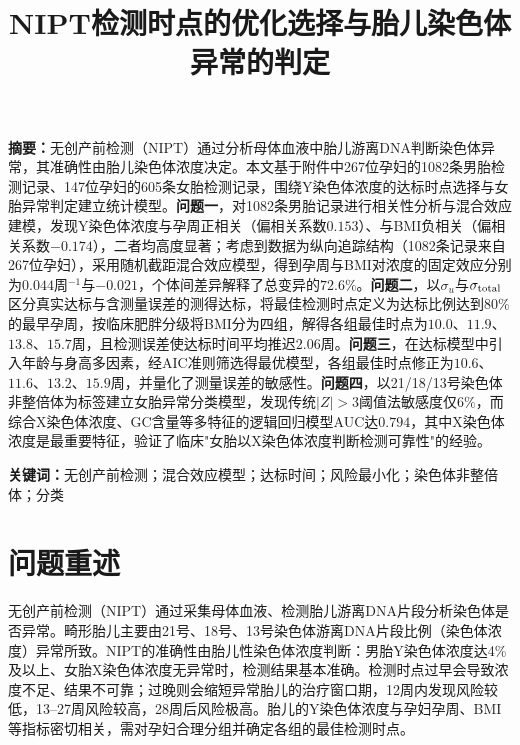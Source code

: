 \documentclass[12pt]{ctexart}
\title{\textbf{NIPT检测时点的优化选择与胎儿染色体异常的判定}}
\author{}
\date{}
\begin{document}
\maketitle

\begin{center}
\begin{minipage}{0.92\textwidth}
\small
\textbf{摘要：}无创产前检测（NIPT）通过分析母体血液中胎儿游离DNA判断染色体异常，其准确性由胎儿染色体浓度决定。本文基于附件中267位孕妇的1082条男胎检测记录、147位孕妇的605条女胎检测记录，围绕Y染色体浓度的达标时点选择与女胎异常判定建立统计模型。\textbf{问题一}，对1082条男胎记录进行相关性分析与混合效应建模，发现Y染色体浓度与孕周正相关（偏相关系数$0.153$）、与BMI负相关（偏相关系数$-0.174$），二者均高度显著；考虑到数据为纵向追踪结构（1082条记录来自267位孕妇），采用随机截距混合效应模型，得到孕周与BMI对浓度的固定效应分别为$0.044$周$^{-1}$与$-0.021$，个体间差异解释了总变异的$72.6\%$。\textbf{问题二}，以$\sigma_u$与$\sigma_{\rm total}$区分真实达标与含测量误差的测得达标，将最佳检测时点定义为达标比例达到80\%的最早孕周，按临床肥胖分级将BMI分为四组，解得各组最佳时点为$10.0$、$11.9$、$13.8$、$15.7$周，且检测误差使达标时间平均推迟$2.06$周。\textbf{问题三}，在达标模型中引入年龄与身高多因素，经AIC准则筛选得最优模型，各组最佳时点修正为$10.6$、$11.6$、$13.2$、$15.9$周，并量化了测量误差的敏感性。\textbf{问题四}，以21/18/13号染色体非整倍体为标签建立女胎异常分类模型，发现传统$|Z|>3$阈值法敏感度仅$6\%$，而综合X染色体浓度、GC含量等多特征的逻辑回归模型AUC达$0.794$，其中X染色体浓度是最重要特征，验证了临床"女胎以X染色体浓度判断检测可靠性"的经验。
\end{minipage}
\end{center}

\vspace{0.5em}
\noindent\textbf{关键词：}无创产前检测；混合效应模型；达标时间；风险最小化；染色体非整倍体；分类

\section{问题重述}

无创产前检测（NIPT）通过采集母体血液、检测胎儿游离DNA片段分析染色体是否异常。畸形胎儿主要由21号、18号、13号染色体游离DNA片段比例（染色体浓度）异常所致。NIPT的准确性由胎儿性染色体浓度判断：男胎Y染色体浓度达4\%及以上、女胎X染色体浓度无异常时，检测结果基本准确。检测时点过早会导致浓度不足、结果不可靠；过晚则会缩短异常胎儿的治疗窗口期，12周内发现风险较低，13--27周风险较高，28周后风险极高。胎儿的Y染色体浓度与孕妇孕周、BMI等指标密切相关，需对孕妇合理分组并确定各组的最佳检测时点。
\end{document}
